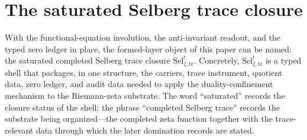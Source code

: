 \documentclass[11pt]{article}
\newcommand{\Sel}{\mathrm{Sel}^{!}_{\zeta,\mathrm{tr}}}
\theoremstyle{definition}
\begin{document}
\section{The saturated Selberg trace closure}
\label{sec:sat_sel_shell}

With the functional-equation involution, the anti-invariant readout,
and the typed zero ledger in place, the formed-layer object of this
paper can be named: the saturated completed Selberg trace closure
\(\Sel\).  Concretely, \(\Sel\) is a typed shell that packages, in
one structure, the carriers, trace instrument, quotient data, zero
ledger, and audit data needed to apply the duality-confinement
mechanism to the Riemann-zeta substrate.  The word ``saturated''
records the closure status of the shell; the phrase ``completed
Selberg trace'' records the substrate being organized---the
completed zeta function together with the trace-relevant data
through which the later domination records are stated.
\end{document}
